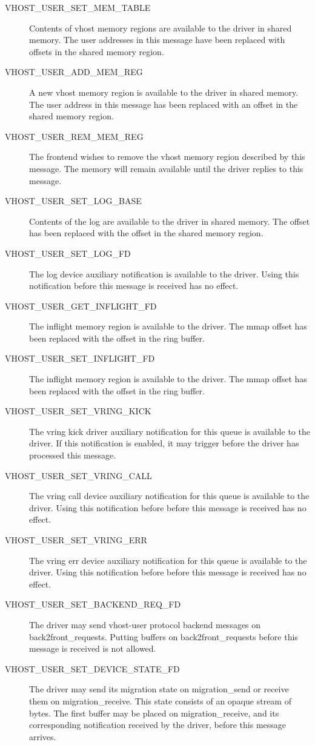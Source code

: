 \begin{description}
\item[VHOST_USER_SET_MEM_TABLE]
    Contents of vhost memory regions are available to the
    driver in shared memory. The user addresses in this message
    have been replaced with offsets in the shared memory region.
\item[VHOST_USER_ADD_MEM_REG]
    A new vhost memory region is available to the driver in
    shared memory. The user address in this message has been
    replaced with an offset in the shared memory region.
\item[VHOST_USER_REM_MEM_REG]
    The frontend wishes to remove the vhost memory region
    described by this message. The memory will remain available
    until the driver replies to this message.
\item[VHOST_USER_SET_LOG_BASE]
    Contents of the log are available to the driver in shared
    memory. The offset has been replaced with the offset in the
    shared memory region.
\item[VHOST_USER_SET_LOG_FD]
    The log device auxiliary notification is available to the
    driver. Using this notification before this message is
    received has no effect.
\item[VHOST_USER_GET_INFLIGHT_FD]
    The inflight memory region is available to the driver. The
    mmap offset has been replaced with the offset in the ring
    buffer.
\item[VHOST_USER_SET_INFLIGHT_FD]
    The inflight memory region is available to the driver. The
    mmap offset has been replaced with the offset in the ring
    buffer.
\item[VHOST_USER_SET_VRING_KICK]
    The vring kick driver auxiliary notification for this queue
    is available to the driver. If this notification is enabled,
    it may trigger before the driver has processed this message.
\item[VHOST_USER_SET_VRING_CALL]
    The vring call device auxiliary notification for this queue
    is available to the driver. Using this notification before
    before this message is received has no effect.
\item[VHOST_USER_SET_VRING_ERR]
    The vring err device auxiliary notification for this queue
    is available to the driver. Using this notification before
    before this message is received has no effect.
\item[VHOST_USER_SET_BACKEND_REQ_FD]
    The driver may send vhost-user protocol backend messages on
    back2front_requests. Putting buffers on back2front_requests
    before this message is received is not allowed.
\item[VHOST_USER_SET_DEVICE_STATE_FD]
    The driver may send its migration state on migration_send or
    receive them on migration_receive. This state consists of an
    opaque stream of bytes. The first buffer may be placed on
    migration_receive, and its corresponding notification
    received by the driver, before this message arrives.
\end{description}


